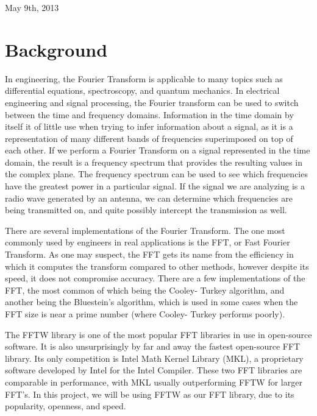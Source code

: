 \documentclass[conference]{IEEEtran}
\begin{document}
 
\hfill May 9th, 2013

\section{Background}

In engineering, the Fourier Transform is applicable to many topics such as 
differential equations, spectroscopy, and quantum mechanics. In electrical
engineering and signal processing, the Fourier transform can be used to
switch between the time and frequency domains. Information in the time
domain by itself it of little use when trying to infer information about
a signal, as it is a representation of many different bands of frequencies
superimposed on top of each other. If we perform a Fourier Transform on 
a signal represented in the time domain, the result is a frequency spectrum
that provides the resulting values in the complex plane. The frequency
spectrum can be used to see which frequencies have the greatest power
in a particular signal. If the signal we are analyzing is a radio wave
generated by an antenna, we can determine which frequencies are being
transmitted on, and quite possibly intercept the transmission as well.

There are several implementations of the Fourier Transform. The one most
commonly used by engineers in real applications is the FFT, or Fast
Fourier Transform. As one may suspect, the FFT gets its name from the
efficiency in which it computes the transform compared to other methods,
however despite its speed, it does not compromise accuracy. There are a 
few implementations of the FFT, the most common of which being the Cooley-
Turkey algorithm, and another being the Bluestein's algorithm, which is
used in some cases when the FFT size is near a prime number (where Cooley-
Turkey performs poorly). 

The FFTW library is one of the most popular FFT libraries in use in
open-source software. It is also unsurprisingly by far and away the fastest open-source
FFT library. Its only competition is Intel Math Kernel Library (MKL),
a proprietary software developed by Intel for the Intel Compiler. These
two FFT libraries are comparable in performance, with MKL usually outperforming
FFTW for larger FFT's. In this project, we will be using FFTW as our 
FFT library, due to its popularity, openness, and speed.
\end{document}
